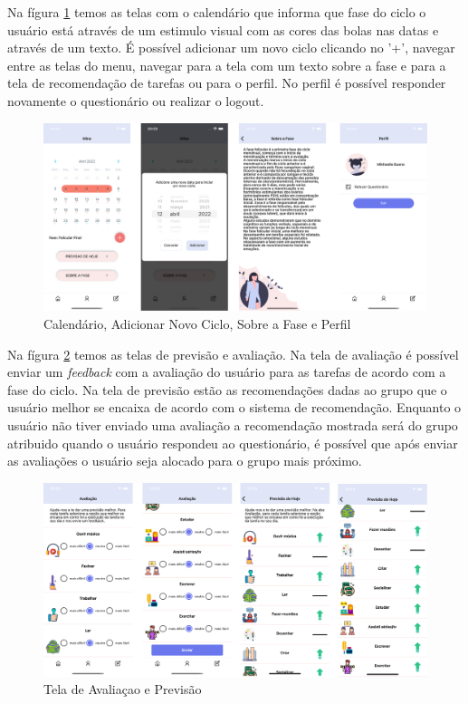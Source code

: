 Na fígura \ref{fig21} temos as telas com o calendário que informa que fase do ciclo o usuário está através 
de um estimulo visual com as cores das bolas nas datas e através de um texto. É possível adicionar um novo ciclo 
clicando no '+', navegar entre as telas do menu, navegar para a tela com um texto sobre a fase e para a tela 
de recomendação de tarefas ou para o perfil. No perfil é possível responder novamente o questionário ou 
realizar o logout.

\begin{figure}[ht]
    \centering
    \includegraphics[keepaspectratio=true,scale=0.08]{figuras/aplicativo2.png}
    \caption{Calendário, Adicionar Novo Ciclo, Sobre a Fase e Perfil}
        \label{fig21}
\end{figure}

Na fígura \ref{fig22} temos as telas de previsão e avaliação. Na tela de avaliação é possível enviar 
um \emph{feedback} com a avaliação do usuário para as tarefas de acordo com a fase do ciclo. Na tela de 
previsão estão as recomendações dadas ao grupo que o usuário melhor se encaixa de acordo com o sistema de recomendação.
Enquanto o usuário não tiver enviado uma avaliação a recomendação mostrada será do grupo atribuido quando o 
usuário respondeu ao questionário, é possível que após enviar as avaliações o usuário seja alocado 
para o grupo mais próximo.

\begin{figure}[ht]
    \centering
    \includegraphics[keepaspectratio=true,scale=0.08]{figuras/aplicativo3.png}
    \caption{Tela de Avaliaçao e Previsão}
        \label{fig22}
\end{figure}

